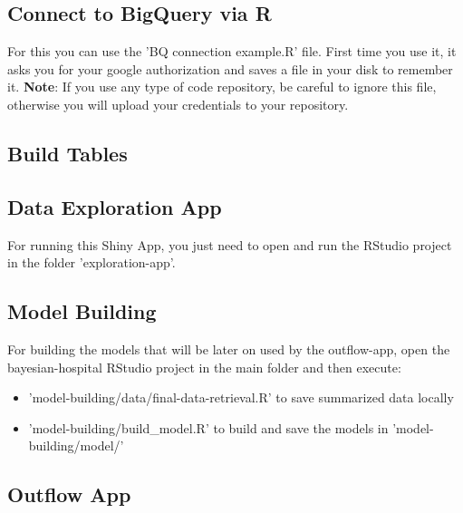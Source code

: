 \documentclass[12pt]{article}
\begin{document}
\subsection*{Connect to BigQuery via R}

For this you can use the 'BQ connection example.R' file. First time you use it, it asks you for your google authorization and saves a file in your disk to remember it. \textbf{Note}: If you use any type of code repository, be careful to ignore this file, otherwise you will upload your credentials to your repository. 

\subsection*{Build Tables}



\subsection*{Data Exploration App}

For running this Shiny App, you just need to open and run the RStudio project in the folder 'exploration-app'.

\subsection*{Model Building}

For building the models that will be later on used by the outflow-app, open the bayesian-hospital RStudio project in the main folder and then execute:

\begin{itemize}
	\item 'model-building/data/final-data-retrieval.R' to save summarized data locally 
	\item 'model-building/build\_model.R' to build and save the models in 'model-building/model/'
\end{itemize} 


\subsection*{Outflow App}

\end{document}
